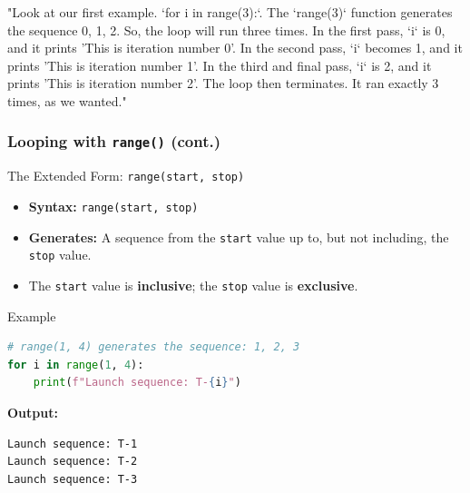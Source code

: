 \documentclass{beamer}
\begin{document}
\begin{frame}[fragile]
{    "Look at our first example. `for i in range(3):`. The `range(3)` function generates the sequence 0, 1, 2. So, the loop will run three times.
    In the first pass, `i` is 0, and it prints 'This is iteration number 0'.
    In the second pass, `i` becomes 1, and it prints 'This is iteration number 1'.
    In the third and final pass, `i` is 2, and it prints 'This is iteration number 2'.
    The loop then terminates. It ran exactly 3 times, as we wanted."
    }
\end{frame}

\begin{frame}[fragile]
    \frametitle{Looping with \texttt{range()} (cont.)}
    
    \begin{block}{The Extended Form: \texttt{range(start, stop)}}
        \begin{itemize}
            \item \textbf{Syntax:} \texttt{range(start, stop)}
            \item \textbf{Generates:} A sequence from the \texttt{start} value up to, but not including, the \texttt{stop} value.
            \item The \texttt{start} value is \textbf{inclusive}; the \texttt{stop} value is \textbf{exclusive}.
        \end{itemize}
    \end{block}

    \begin{block}{Example}
        \begin{lstlisting}[language=Python]
# range(1, 4) generates the sequence: 1, 2, 3
for i in range(1, 4):
    print(f"Launch sequence: T-{i}")
        \end{lstlisting}
        \textbf{Output:}
        \begin{verbatim}
Launch sequence: T-1
Launch sequence: T-2
Launch sequence: T-3
        \end{verbatim}
    \end{block}

\end{frame}
\end{document}
